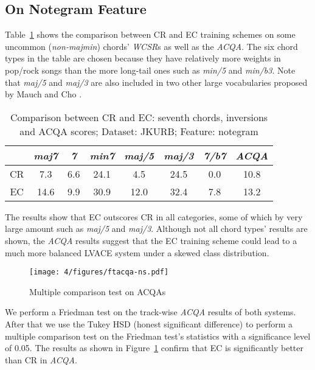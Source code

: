 \subsection{On Notegram Feature}
Table~\ref{tab:4-acqa-ns} shows the comparison between CR and EC training schemes on some uncommon (\textit{non-majmin}) \cite{burgoyne2011expert} chords' \textit{WCSR}s as well as the \textit{ACQA}. The six chord types in the table are chosen because they have relatively more weights in pop/rock songs than the more long-tail ones such as \textit{min/5} and \textit{min/b3}. Note that \textit{maj/5} and \textit{maj/3} are also included in two other large vocabularies proposed by Mauch \cite{mauch2010automatic} and Cho \cite{cho2014improved}.
\begin{table}[htb]
	\centering
	\scriptsize
	\begin{tabular}{|c|c|c|c|c|c|c|c|} \hline
		& \textit{maj7} & \textit{7} & \textit{min7} & \textit{maj/5} & \textit{maj/3} & \textit{7/b7} & \textit{ACQA} \\ \hline
		CR & 7.3 & 6.6 & 24.1 & 4.5 & 24.5 & 0.0 & 10.8 \\ \hline
		EC &  14.6 & 9.9 & 30.9 & 12.0 & 32.4 & 7.8 & 13.2 \\ \hline
	\end{tabular}
	\caption{Comparison between CR and EC: seventh chords, inversions and ACQA scores; Dataset: JKURB; Feature: notegram}
	\label{tab:4-acqa-ns}
\end{table}

The results show that EC outscores CR in all categories, some of which by very large amount such as \textit{maj/5} and \textit{maj/3}. Although not all chord types' results are shown, the \textit{ACQA} results suggest that the EC training scheme could lead to a much more balanced LVACE system under a skewed class distribution.

\begin{figure}[htb]
	\centering
	\texttt{[image: 4/figures/ftacqa-ns.pdf]}
	\caption{Multiple comparison test on ACQAs}
	\label{fig:4-ftacqa-ns}
\end{figure}
We perform a Friedman test on the track-wise \textit{ACQA} results of both systems. After that we use the Tukey HSD (honest significant difference) to perform a multiple comparison test on the Friedman test's statistics with a significance level of 0.05. The results as shown in Figure~\ref{fig:4-ftacqa-ns} confirm that EC is significantly better than CR in \textit{ACQA}.

